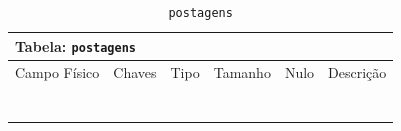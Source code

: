\documentclass[12pt,a4paper]{article}
\begin{document}
\begin{center}
\begin{table}[h!]
	\caption{\texttt{postagens}}
	\label{tabela:postagens}
	\begin{tabular}{|p{2.3cm}|p{1.2cm}|p{1.8cm}|p{1.5cm}|p{1cm}|p{6cm}|}\hline		
		\multicolumn{6}{|p{16cm}|}{\cellcolor{cinzaClaro}  \centering Tabela: \texttt{postagens}} \\ \hline %
		{\small Campo Físico}   & {\small Chaves} & {\small Tipo} & {\small Tamanho} & {\small Nulo} & {\small Descrição}\\\hline %
		
		{\tiny } & {\tiny } & {\tiny } & {\tiny } & {\tiny } &{\tiny }\\\hline
		{\tiny } & {\tiny } & {\tiny } & {\tiny } & {\tiny } &{\tiny }\\\hline
		{\tiny } & {\tiny } & {\tiny } & {\tiny } & {\tiny } &{\tiny }\\\hline
		{\tiny } & {\tiny } & {\tiny } & {\tiny } & {\tiny } &{\tiny }\\\hline
		{\tiny } & {\tiny } & {\tiny } & {\tiny } & {\tiny } &{\tiny }\\\hline
		{\tiny } & {\tiny } & {\tiny } & {\tiny } & {\tiny } &{\tiny }\\\hline
		{\tiny } & {\tiny } & {\tiny } & {\tiny } & {\tiny } &{\tiny }\\\hline
		
			
	\end{tabular}
\end{table}	
\end{center}
\end{document}
